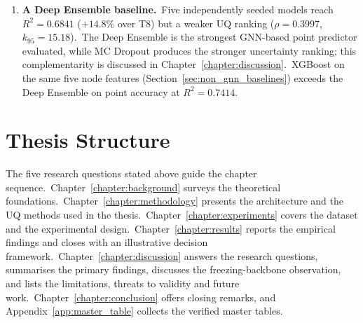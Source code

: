 \begin{enumerate}
 \item \textbf{A Deep Ensemble baseline.}\ Five independently seeded models reach $R^2 = 0.6841$ ($+14.8\%$ over T8) but a weaker UQ ranking ($\rho = 0.3997$, $k_{95} = 15.18$).\ The Deep Ensemble is the strongest GNN-based point predictor evaluated, while MC Dropout produces the stronger uncertainty ranking; this complementarity is discussed in Chapter~\ref{chapter:discussion}.\ XGBoost on the same five node features (Section~\ref{sec:non_gnn_baselines}) exceeds the Deep Ensemble on point accuracy at $R^2 = 0.7414$.
\end{enumerate}

\section{Thesis Structure}\label{sec:structure}

The five research questions stated above guide the chapter sequence.\ Chapter~\ref{chapter:background} surveys the theoretical foundations.\ Chapter~\ref{chapter:methodology} presents the architecture and the UQ methods used in the thesis.\ Chapter~\ref{chapter:experiments} covers the dataset and the experimental design.\ Chapter~\ref{chapter:results} reports the empirical findings and closes with an illustrative decision framework.\ Chapter~\ref{chapter:discussion} answers the research questions, summarises the primary findings, discusses the freezing-backbone observation, and lists the limitations, threats to validity and future work.\ Chapter~\ref{chapter:conclusion} offers closing remarks, and Appendix~\ref{app:master_table} collects the verified master tables.
